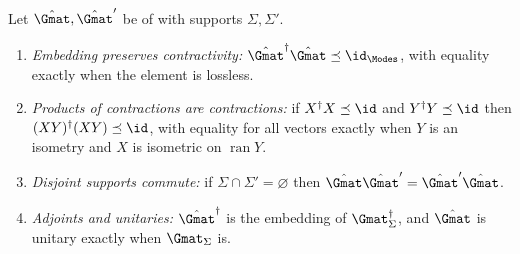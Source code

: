 
\begin{proposition}\label{prop:mode-algebra}
Let $\hat\Gmat,\hat\Gmat'$ be  of
 with supports $\Sigma,\Sigma'$.
\begin{enumerate}[label=(\roman*),leftmargin=3.0em]
\item \emph{Embedding preserves contractivity:}
  $\hat\Gmat^\dagger\hat\Gmat\preceq\id_{\Modes}$, with equality exactly when
  the element is lossless.
\item \emph{Products of contractions are contractions:} if
  $X^\dagger X\preceq\id$ and $Y^\dagger Y\preceq\id$ then
  $(XY)^\dagger(XY)\preceq\id$, with equality for all vectors exactly when
  $Y$ is an isometry and $X$ is isometric on $\operatorname{ran}Y$.
\item \emph{Disjoint supports commute:} if $\Sigma\cap\Sigma'=\varnothing$ then
  $\hat\Gmat\hat\Gmat'=\hat\Gmat'\hat\Gmat$.
\item \emph{Adjoints and unitaries:} $\hat\Gmat^\dagger$ is the embedding of
  $\Gmat_\Sigma^\dagger$, and $\hat\Gmat$ is unitary exactly when
  $\Gmat_\Sigma$ is.
\end{enumerate}
\end{proposition}

